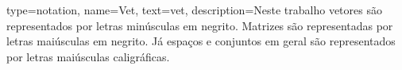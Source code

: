 %
%
%

{
	type=notation,
	name=Vet,
	text={vet},
	description={Neste trabalho vetores são representados por letras minúsculas em
		negrito. Matrizes são representadas por letras maiúsculas em negrito.
		Já espaços e conjuntos em geral são representados por letras maiúsculas
		caligráficas.}
}





 
